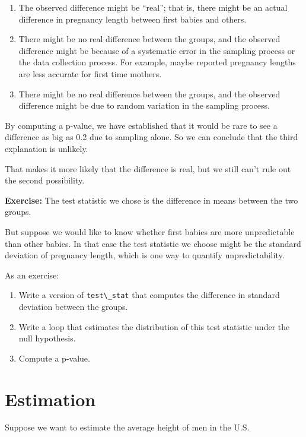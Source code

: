 \begin{enumerate}
\def\labelenumi{\arabic{enumi}.}
\item
  The observed difference might be ``real''; that is, there might be an
  actual difference in pregnancy length between first babies and others.
\item
  There might be no real difference between the groups, and the observed
  difference might be because of a systematic error in the sampling
  process or the data collection process. For example, maybe reported
  pregnancy lengths are less accurate for first time mothers.
\item
  There might be no real difference between the groups, and the observed
  difference might be due to random variation in the sampling process.
\end{enumerate}

By computing a p-value, we have established that it would be rare to see
a difference as big as 0.2 due to sampling alone. So we can conclude
that the third explanation is unlikely.

That makes it more likely that the difference is real, but we still
can't rule out the second possibility.

\textbf{Exercise:} The test statistic we chose is the difference in
means between the two groups.

But suppose we would like to know whether first babies are more
unpredictable than other babies. In that case the test statistic we
choose might be the standard deviation of pregnancy length, which is one
way to quantify unpredictability.

As an exercise:

\begin{enumerate}
\def\labelenumi{\arabic{enumi}.}
\item
  Write a version of \passthrough{\lstinline!test\_stat!} that computes
  the difference in standard deviation between the groups.
\item
  Write a loop that estimates the distribution of this test statistic
  under the null hypothesis.
\item
  Compute a p-value.
\end{enumerate}

\hypertarget{estimation}{%
\section{Estimation}\label{estimation}}

Suppose we want to estimate the average height of men in the U.S.

